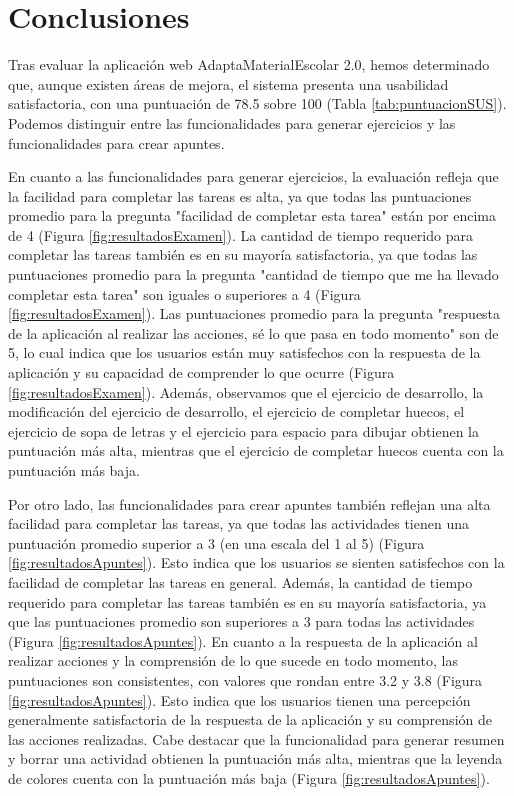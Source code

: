 \section{Conclusiones}\label{sec:conclusionesEvaluacion}
Tras evaluar la aplicación web AdaptaMaterialEscolar 2.0, hemos determinado que, aunque existen áreas de mejora, el sistema presenta una usabilidad satisfactoria, con una puntuación de 78.5 sobre 100 (Tabla \ref{tab:puntuacionSUS}). Podemos distinguir entre las funcionalidades para generar ejercicios y las funcionalidades para crear apuntes.

En cuanto a las funcionalidades para generar ejercicios, la evaluación refleja que la facilidad para completar las tareas es alta, ya que todas las puntuaciones promedio para la pregunta "facilidad de completar esta tarea" están por encima de 4 (Figura \ref{fig:resultadosExamen}). La cantidad de tiempo requerido para completar las tareas también es en su mayoría satisfactoria, ya que todas las puntuaciones promedio para la pregunta "cantidad de tiempo que me ha llevado completar esta tarea" son iguales o superiores a 4 (Figura \ref{fig:resultadosExamen}). Las puntuaciones promedio para la pregunta "respuesta de la aplicación al realizar las acciones, sé lo que pasa en todo momento" son de 5, lo cual indica que los usuarios están muy satisfechos con la respuesta de la aplicación y su capacidad de comprender lo que ocurre (Figura \ref{fig:resultadosExamen}). Además, observamos que el ejercicio de desarrollo, la modificación del ejercicio de desarrollo, el ejercicio de completar huecos, el ejercicio de sopa de letras y el ejercicio para espacio para dibujar obtienen la puntuación más alta, mientras que el ejercicio de completar huecos cuenta con la puntuación más baja.

Por otro lado, las funcionalidades para crear apuntes también reflejan una alta facilidad para completar las tareas, ya que todas las actividades tienen una puntuación promedio superior a 3 (en una escala del 1 al 5) (Figura \ref{fig:resultadosApuntes}). Esto indica que los usuarios se sienten satisfechos con la facilidad de completar las tareas en general. Además, la cantidad de tiempo requerido para completar las tareas también es en su mayoría satisfactoria, ya que las puntuaciones promedio son superiores a 3 para todas las actividades (Figura \ref{fig:resultadosApuntes}). En cuanto a la respuesta de la aplicación al realizar acciones y la comprensión de lo que sucede en todo momento, las puntuaciones son consistentes, con valores que rondan entre 3.2 y 3.8 (Figura \ref{fig:resultadosApuntes}). Esto indica que los usuarios tienen una percepción generalmente satisfactoria de la respuesta de la aplicación y su comprensión de las acciones realizadas. Cabe destacar que la funcionalidad para generar resumen y borrar una actividad obtienen la puntuación más alta, mientras que la leyenda de colores cuenta con la puntuación más baja (Figura \ref{fig:resultadosApuntes}).


